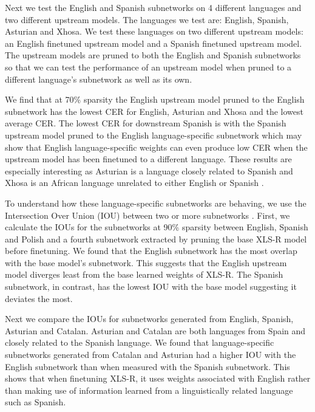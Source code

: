 Next we test the English and Spanish subnetworks on 4 different languages and two different upstream models. The languages we test are: English, Spanish, Asturian and Xhosa. We test these languages on two different upstream models: an English finetuned upstream model and a Spanish finetuned upstream model. The upstream models are pruned to both the English and Spanish subnetworks so that we can test the performance of an upstream model when pruned to a different language's subnetwork as well as its own. 

We find that at 70\% sparsity the English upstream model pruned to the English subnetwork has the lowest CER for English, Asturian and Xhosa and the lowest average CER. The lowest CER for downstream Spanish is with the Spanish upstream model pruned to the English language-specific subnetwork which may show that English language-specific weights can even produce low CER when the upstream model has been finetuned to a different language. These results are especially interesting as Asturian is a language closely related to Spanish and Xhosa is an African language unrelated to either English or Spanish \cite{chang2022distilhubert}. %

To understand how these language-specific subnetworks are behaving, we use the Intersection Over Union (IOU) between two or more subnetworks \cite{PARP}. First, we calculate the IOUs for the subnetworks at 90\% sparsity between English, Spanish and Polish and a fourth subnetwork extracted by pruning the base XLS-R model before finetuning. We found that the English subnetwork has the most overlap with the base model's subnetwork. This suggests that the English upstream model diverges least from the base learned weights of XLS-R. The Spanish subnetwork, in contrast, has the lowest IOU with the base model suggesting it deviates the most. 

Next we compare the IOUs for subnetworks generated from English, Spanish, Asturian and Catalan. Asturian and Catalan are both languages from Spain and closely related to the Spanish language. We found that language-specific subnetworks generated from Catalan and Asturian had a higher IOU with the English subnetwork than when measured with the Spanish subnetwork. This shows that when finetuning XLS-R, it uses weights associated with English rather than making use of information learned from a linguistically related language such as Spanish.


